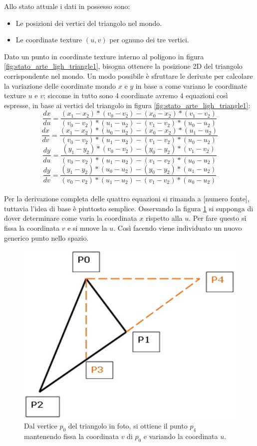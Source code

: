 Allo stato attuale i dati in possesso sono:	
\begin{itemize}
\item Le posizioni dei vertici del triangolo nel mondo.
\item Le coordinate texture $(u,v)$ per ognuno dei tre vertici.
\end{itemize}
Dato un punto in coordinate texture interno al poligono in figura \ref{fig:stato_arte_ligh_triangle1}, bisogna ottenere la posizione 2D del triangolo corrispondente nel mondo.
Un modo possibile è sfruttare le derivate per calcolare la variazione delle coordinate mondo $x$ e $y$ in base a come variano le coordinate texture $u$ e $v$; siccome in tutto sono 4 coordinate avremo 4 equazioni così espresse, in base ai vertici del triangolo in figura \ref{fig:stato_arte_ligh_triangle1}:
\\
\begin{equation}
\frac{dx}{du} = \frac{(x_1 - x_2)*(v_0 - v_2) - (x_0 - x_2)*(v_1 - v_2)}{(v_0 - v_2)*(u_1 - u_2) - (v_1 - v_2)*(u_0 - u_2)}
\label{dxdu}
\end{equation}
\begin{equation}
\frac{dx}{dv} = \frac{(x_1 - x_2)*(u_0 - u_2) - (x_0 - x_2)*(u_1 - u_2)}{(v_0 - v_2)*(u_1 - u_2) - (v_1 - v_2)*(u_0 - u_2)}
\label{dxdv} 
\end{equation}
\begin{equation}
\frac{dy}{du} = \frac{(y_1 - y_2)*(v_0 - v_2) - (y_0 - y_2)*(v_1 - v_2)}{(v_0 - v_2)*(u_1 - u_2) - (v_1 - v_2)*(u_0 - u_2)}
\label{dydu}
\end{equation}
\begin{equation}
\frac{dy}{dv} = \frac{(y_1 - y_2)*(u_0 - u_2) - (y_0 - y_2)*(u_1 - u_2)}{(v_0 - v_2)*(u_1 - u_2) - (v_1 - v_2)*(u_0 - u_2)} 
\label{dydv}
\end{equation}
\\
Per la derivazione completa delle quattro equazioni si rimanda a [numero fonte], tuttavia l’idea di base è piuttosto semplice. Osservando la figura \ref{fig:stato_arte_ligh_triangle2} si supponga di dover determinare come varia la coordinata $x$ rispetto alla $u$. Per fare questo si fissa la coordinata $v$ e si muove la $u$. Così facendo viene individuato un nuovo generico punto nello spazio. 
\\
\begin{figure}[htb]
 \centering
 \includegraphics[width=0.5\linewidth]{images/chapter_stato_arte/stato_arte_ligh_triangle2.png}\hfill
 \caption[Triangolo di esempio per calcolo coordinate]{Dal vertice $p_0$ del triangolo in foto, si ottiene il punto $p_4$ mantenendo fissa la coordinata $v$ di $p_0$ e variando la coordinata $u$.}
 \label{fig:stato_arte_ligh_triangle2}
\end{figure}
